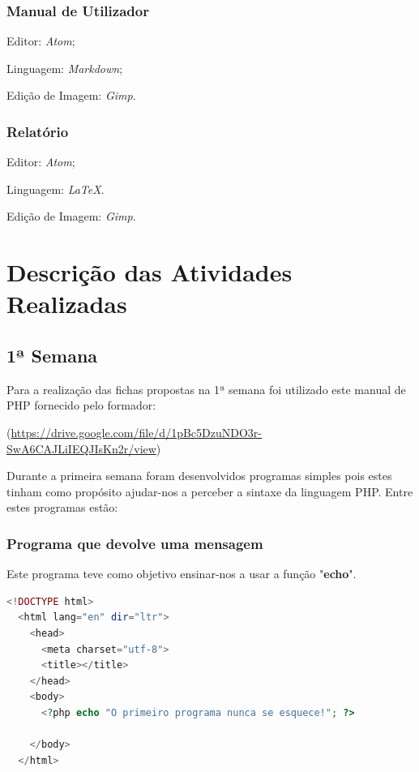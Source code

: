 \documentclass[14pt]{article}
\begin{document}
\subsubsection{Manual de Utilizador}
\begin{list}{•}
  \item Editor: \textit{Atom};
  \item
  \item Linguagem: \textit{Markdown};
  \item Edição de Imagem: \textit{Gimp}.
\end{list}


\subsubsection{Relatório}
\begin{list}{•}
\item Editor: \textit{Atom};
\item
\item Linguagem: \textit{LaTeX}.
\item Edição de Imagem: \textit{Gimp}.
\end{list}

\section{Descrição das Atividades Realizadas}
\subsection{1ª Semana}
Para a realização das fichas propostas na 1ª semana foi utilizado este manual de PHP fornecido pelo formador:

(\url{https://drive.google.com/file/d/1pBc5DzuNDO3r-SwA6CAJLiIEQJIsKn2r/view})

Durante a primeira semana foram desenvolvidos programas simples pois estes tinham como propósito ajudar-nos a perceber a sintaxe da linguagem PHP.
Entre estes programas estão:
\subsubsection{Programa que devolve uma mensagem}
Este programa teve como objetivo ensinar-nos a usar a função "\textbf{echo}".
\begin{lstlisting}[language=PHP]
  <!DOCTYPE html>
  <html lang="en" dir="ltr">
    <head>
      <meta charset="utf-8">
      <title></title>
    </head>
    <body>
      <?php echo "O primeiro programa nunca se esquece!"; ?>

    </body>
  </html>

\end{lstlisting}
\end{document}
